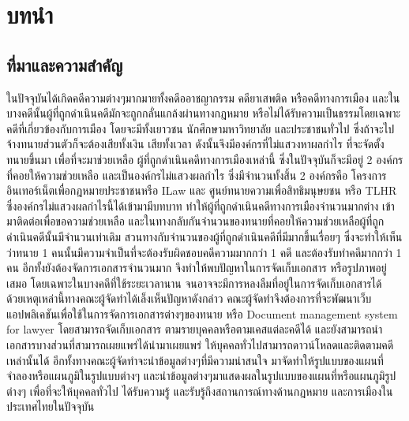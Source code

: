 \documentclass[12pt,oneside,openright,a4paper]{cpe-thai-project}
\begin{document}



\chapter{บทนำ}

\section{ที่มาและความสำคัญ}

\hspace*{1cm} ในปัจจุบันได้เกิดคดีความต่างๆมากมายทั้งคดีออาชญากรรม คดียาเสพติด หรือคดีทางการเมือง และในบางคดีนั้นผู้ที่ถูกดำเนินคดีมักจะถูกกลั่นแกล้งผ่านทางกฎหมาย หรือไม่ได้รับความเป็นธรรมโดยเฉพาะคดีที่เกี่ยวข้องกับการเมือง โดยจะมีทั้งเยาวชน นักศึกษามหาวิทยาลัย และประชาชนทั่วไป ซึ่งถ้าจะไปจ้างทนายส่วนตัวก็จะต้องเสียทั้งเงิน เสียทั้งเวลา ดังนั้นจึงมีองค์กรที่ไม่แสวงหาผลกำไร ที่จะจัดตั้งทนายขึ้นมา เพื่อที่จะมาช่วยเหลือ ผู้ที่ถูกดำเนินคดีทางการเมืองเหล่านี้ ซึ่งในปัจจุบันก็จะมีอยู่ 2 องค์กรที่คอยให้ความช่วยเหลือ และเป็นองค์กรไม่แสวงผลกำไร ซึ่งมีจำนวนทั้งสิ้น 2 องค์กรคือ โครงการอินเทอร์เน็ตเพื่อกฎหมายประชาชนหรือ ILaw และ ศูนย์ทนายความเพื่อสิทธิมนุษยชน หรือ TLHR ซึ่งองค์กรไม่แสวงผลกำไรนี้ได้เข้ามามีบทบาท ทำให้ผู้ที่ถูกดำเนินคดีทางการเมืองจำนวนมากต่าง เข้ามาติดต่อเพื่อขอความช่วยเหลือ และในทางกลับกันจำนวนของทนายที่คอยให้ความช่วยเหลือผู้ที่ถูกดำเนินคดีนั้นมีจำนวนเท่าเดิม สวนทางกับจำนวนของผู้ที่ถูกดำเนินคดีที่มีมากขึ้นเรื่อยๆ ซึ่งจะทำให้เห็นว่าทนาย 1 คนนั้นมีความจำเป็นที่จะต้องรับผิดชอบคดีความมากกว่า 1 คดี และต้องรับทำคดีมากกว่า 1 คน อีกทั้งยังต้องจัดการเอกสารจำนวนมาก จึงทำให้พบปัญหาในการจัดเก็บเอกสาร หรือรูปภาพอยู่เสมอ โดยเฉพาะในบางคดีที่ใช้ระยะเวลานาน จนอาจจะมีการหลงลืมที่อยู่ในการจัดเก็บเอกสารได้ \\
\hspace*{1cm} ด้วยเหตุเหล่านี้ทางคณะผู้จัดทำได้เล็งเห็นปัญหาดังกล่าว คณะผู้จัดทำจึงต้องการที่จะพัฒนาเว็บแอปพลิเคชันเพื่อใช้ในการจัดการเอกสารต่างๆของทนาย หรือ Document management system for lawyer โดยสามารถจัดเก็บเอกสาร ตามรายบุคคลหรือตามเคสแต่ละคดีได้ และยังสามารถนำเอกสารบางส่วนที่สามารถเผยแพร่ได้นำมาเผยแพร่ ให้บุคคลทั่วไปสามารถดาวน์โหลดและติดตามคดีเหล่านั้นได้ อีกทั้งทางคณะผู้จัดทำจะนำข้อมูลต่างๆที่มีความน่าสนใจ มาจัดทำให้รูปแบบของแผนที่จำลองหรือแผนภูมิในรูปแบบต่างๆ และนำข้อมูลต่างๆมาแสดงผลในรูปแบบของแผนที่หรือแผนภูมิรูปต่างๆ เพื่อที่จะให้บุคคลทั่วไป ได้รับความรู้ และรับรู้ถึงสถานการณ์ทางด้านกฎหมาย และการเมืองในประเทศไทยในปัจจุบัน
\end{document}
